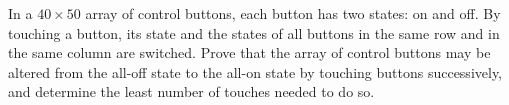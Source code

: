 In a $ 40 \times 50$ array of control buttons, each button has two states: on and off. By touching a button, its state and the states of all buttons in the same row and in the same column are switched. Prove that the array of control buttons may be altered from the all-off state to the all-on state by touching buttons successively, and determine the least number of touches needed to do so.